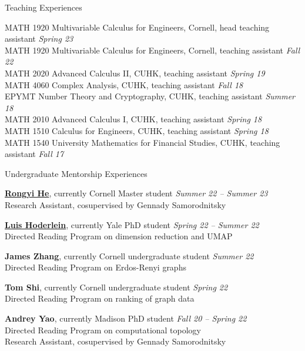 \documentclass{resume} %
\begin{document}
\begin{rSection}{Teaching Experiences}

MATH 1920 
Multivariable Calculus for Engineers, Cornell, head teaching assistant \hfill {\em Spring 23}\\
MATH 1920 
Multivariable Calculus for Engineers, Cornell, teaching assistant \hfill {\em Fall 22}\\
MATH 2020 Advanced Calculus II, CUHK, teaching assistant \hfill {\em Spring 19}\\
MATH 4060 Complex Analysis, CUHK, teaching assistant \hfill {\em Fall 18}\\
EPYMT Number Theory and Cryptography, CUHK, teaching assistant \hfill {\em Summer 18}\\
MATH 2010 Advanced Calculus I, CUHK, teaching assistant \hfill {\em Spring 18}\\
MATH 1510 Calculus for Engineers, CUHK, teaching assistant \hfill {\em Spring 18}\\
MATH 1540 University Mathematics for Financial Studies, CUHK, teaching assistant \hfill {\em Fall 17}
\end{rSection}

\newpage

\begin{rSection}{Undergraduate Mentorship Experiences}

\href{https://www.linkedin.com/in/rongyi-caroline-he}{\textbf{Rongyi He}}, currently Cornell Master student \hfill {\em Summer 22 -- Summer 23} \\
Research Assistant, cosupervised by Gennady Samorodnitsky

\href{https://hoderle.in/}{\textbf{Luis Hoderlein}}, currently Yale PhD student \hfill {\em Spring 22 -- Summer 22} \\
Directed Reading Program on dimension reduction and UMAP

\textbf{James Zhang}, currently Cornell undergraduate student \hfill {\em Summer 22} \\
Directed Reading Program on Erdos-Renyi graphs

\textbf{Tom Shi}, currently Cornell undergraduate student \hfill {\em Spring 22} \\
Directed Reading Program on ranking of graph data

\textbf{Andrey Yao}, currently Madison PhD student \hfill {\em Fall 20 -- Spring 22}\\
Directed Reading Program on computational topology\\
Research Assistant, cosupervised by Gennady Samorodnitsky

\end{rSection}
\end{document}
